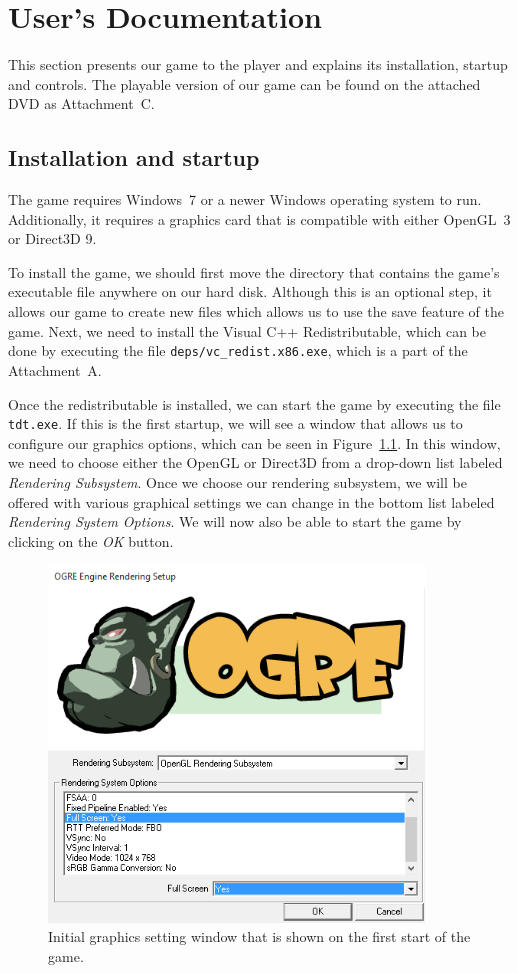 \chapter{User's Documentation}

This section presents our game to the player and explains its installation, startup and controls. The playable version of our game
can be found on the attached DVD as Attachment~C.

\section{Installation and startup}

The game requires Windows~7 or a newer Windows operating system to run. Additionally, it requires a graphics card that is compatible
with either OpenGL~3 or Direct3D 9.

To install the game, we should first move the directory that contains the game's executable file anywhere on our hard disk. Although this is
an optional step, it allows our game to create new files which allows us to use the save feature of the game. Next, we need to install
the Visual C++ Redistributable, which can be done by executing the file \texttt{deps/vc\_redist.x86.exe}, which is a part of the
Attachment~A.

Once the redistributable is installed, we can start the game by executing the file \texttt{tdt.exe}. If this is the first startup, we will
see a window that allows us to configure our graphics options, which can be seen in Figure~\ref{ogre-config}. In this window, we need to
choose either the OpenGL or Direct3D from a drop-down list labeled \emph{Rendering Subsystem}. Once we choose our rendering subsystem, we
will be offered with various graphical settings we can change in the bottom list labeled \emph{Rendering System Options}. We will now also
be able to start the game by clicking on the \emph{OK} button.

\begin{figure}[H]
    \centering
    \includegraphics[width=10cm]{../img/ogre-cfg.png}
    \caption{Initial graphics setting window that is shown on the first start of the game.}
    \label{ogre-config}
\end{figure}

